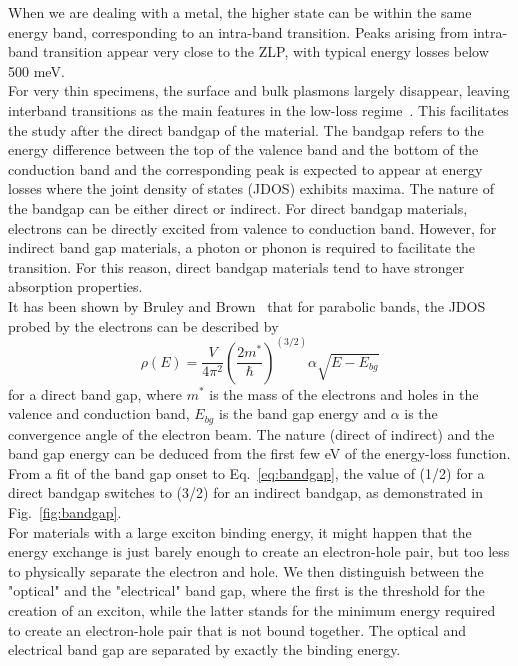 When we are dealing with a metal, the higher state can be within the same energy band, corresponding to 
an intra-band transition.
%
Peaks arising from intra-band transition appear very close to the ZLP, with typical energy losses 
below 500 meV.\\

For very thin specimens, the surface and bulk plasmons largely disappear, leaving
interband transitions as the main features in the low-loss regime~\cite{Egerton:1996}.
%
This facilitates the study after the direct bandgap of the material.
%
The  bandgap  refers  to  the  energy  difference between the top of the valence band 
and the bottom of the conduction band and the corresponding peak is expected to appear 
at energy losses where the joint density of states (JDOS) exhibits maxima. 
%
The nature of the bandgap can be either direct or indirect. For direct bandgap materials,
electrons can be directly excited from valence to conduction band. However, 
for indirect band gap materials, a photon or phonon is required to facilitate the transition.
%
For this reason, direct bandgap materials tend to have stronger absorption properties.\\


It has been shown by Bruley and Brown~\cite{Bruley:1987} that for parabolic bands, 
the JDOS probed by the electrons can be described by
\begin{equation}
\label{eq:bandgap}
    \rho(E) = \frac{V}{4\pi^2} \left( \frac{2m^*}{\hbar} \right)^{(3/2)} \alpha \sqrt{E-E_{bg}}
\end{equation}
for a direct band gap, where $m^*$ is the mass of the electrons and holes in the 
valence and conduction band, $E_{bg}$ is the band gap energy and $\alpha$ is the 
convergence angle of the electron beam.
The nature (direct of indirect) and the band gap energy can be deduced 
from the first few eV of the energy-loss function. 
%
From a fit of the band gap onset to Eq.~\ref{eq:bandgap}, 
the value of (1/2) for a direct bandgap switches to (3/2) for an indirect bandgap,
as demonstrated in Fig.~\ref{fig:bandgap}.\\

For materials with a large exciton binding energy, it might happen that the energy exchange
is just barely enough to create an electron-hole pair, but too less to physically separate the electron and hole.
%
We then distinguish between the "optical" and the "electrical" band gap, where the first is the threshold
for the creation of an exciton, while the latter stands for the minimum energy required to create 
an electron-hole pair that is not bound together.
%
The optical and electrical band gap are separated by exactly the binding energy.\\

